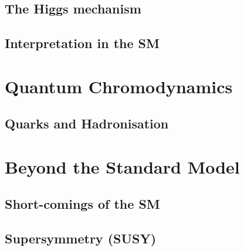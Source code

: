 \subsection{The Higgs mechanism}

\subsection{Interpretation in the SM}

\section{Quantum Chromodynamics}
\label{sec:QCD}

\subsection{Quarks and Hadronisation}

\section{Beyond the Standard Model}
\label{sec:BeyondSM}

\subsection{Short-comings of the SM}

\subsection{Supersymmetry (SUSY)}
